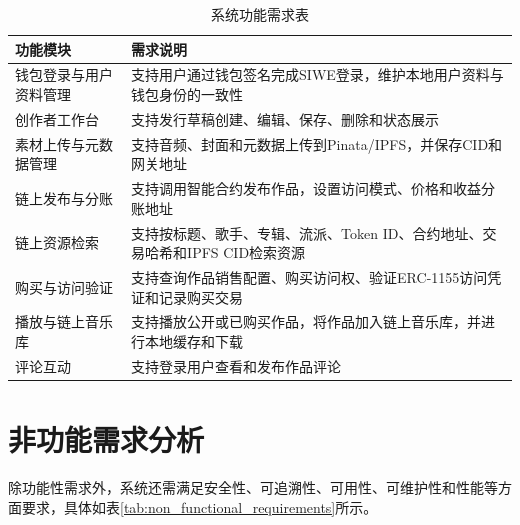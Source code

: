 \begin{table}[htbp]
    \linespread{1.5}
    \songti
    \centering
    \caption{系统功能需求表}\label{tab:functional_requirements}
    \begin{tabular}{|l|p{10cm}|}
        \hline
        功能模块        & 需求说明                                           \\ \hline
        钱包登录与用户资料管理 & 支持用户通过钱包签名完成SIWE登录，维护本地用户资料与钱包身份的一致性           \\ \hline
        创作者工作台      & 支持发行草稿创建、编辑、保存、删除和状态展示                         \\ \hline
        素材上传与元数据管理  & 支持音频、封面和元数据上传到Pinata/IPFS，并保存CID和网关地址          \\ \hline
        链上发布与分账     & 支持调用智能合约发布作品，设置访问模式、价格和收益分账地址                  \\ \hline
        链上资源检索      & 支持按标题、歌手、专辑、流派、Token ID、合约地址、交易哈希和IPFS CID检索资源 \\ \hline
        购买与访问验证     & 支持查询作品销售配置、购买访问权、验证ERC-1155访问凭证和记录购买交易         \\ \hline
        播放与链上音乐库    & 支持播放公开或已购买作品，将作品加入链上音乐库，并进行本地缓存和下载             \\ \hline
        评论互动        & 支持登录用户查看和发布作品评论                                \\ \hline
    \end{tabular}
\end{table}

\section{非功能需求分析}

除功能性需求外，系统还需满足安全性、可追溯性、可用性、可维护性和性能等方面要求，具体如表\ref{tab:non_functional_requirements}所示。

